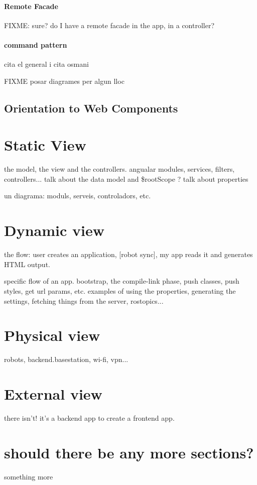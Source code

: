 \paragraph{Remote Facade} FIXME: sure? do I have a remote facade in the app, in a controller?

\paragraph{command pattern} cita el general i cita osmani \cite{Osmani:2012}

FIXME posar diagrames per algun lloc 


\subsection{Orientation to Web Components}

\section{Static View}
the model, the view and the controllers. angualar modules, services, filters, controllers...
talk about the data model and \$rootScope ? talk about properties

un diagrama:
moduls, serveis, controladors, etc. 

\section{Dynamic view}
the flow: user creates an application, [robot sync], my app reads it and generates HTML output.

specific flow of an app. bootstrap, the compile-link phase, push classes, push styles, get url params, etc.
examples of using the properties, generating the settings, fetching things from the server, rostopics...

\section{Physical view}
robots, backend.basestation, wi-fi, vpn...

\section{External view}
there isn't! it's a backend app to create a frontend app.

\section{should there be any more sections?}
something more
